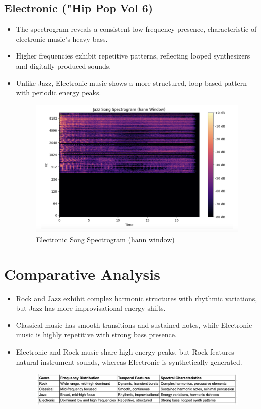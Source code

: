 \documentclass[a4paper,12pt]{article}
\begin{document}
\subsection{Electronic ("Hip Pop Vol 6)}
\begin{itemize}
\item The spectrogram reveals a consistent low-frequency presence, characteristic of electronic music’s heavy bass.
\item Higher frequencies exhibit repetitive patterns, reflecting looped synthesizers and digitally produced sounds.
\item Unlike Jazz, Electronic music shows a more structured, loop-based pattern with periodic energy peaks.
\begin{figure}[H]
    \centering
    \includegraphics[width=1\linewidth]{ElectronicSongSPG.png}
    \caption{Electronic Song Spectrogram (hann window)}
    \label{fig:enter-label}
\end{figure}
\end{itemize}

\newpage
\section{Comparative Analysis}
\begin{itemize}
\item Rock and Jazz exhibit complex harmonic structures with rhythmic variations, but Jazz has more improvisational energy shifts.
\item Classical music has smooth transitions and sustained notes, while Electronic music is highly repetitive with strong bass presence.
\item Electronic and Rock music share high-energy peaks, but Rock features natural instrument sounds, whereas Electronic is synthetically generated.

\begin{figure}[H]
    \centering
    \includegraphics[width=1\linewidth]{ComparativeStudy.png}
    \label{fig:enter-label}
\end{figure}
\end{itemize}
\end{document}
